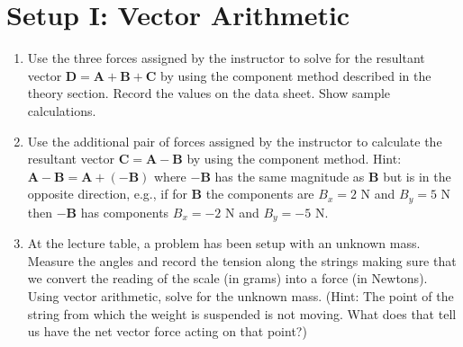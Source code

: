 \documentclass[main.tex]{subfiles}
\begin{document}
\section{Setup I: Vector Arithmetic}
\begin{enumerate}
\item
Use the three forces assigned by the instructor to solve for the resultant vector $\mathbf{D}=\mathbf{A}+\mathbf{B}+\mathbf{C}$ by using the component method described in the theory section. Record the values on the data sheet. Show sample calculations.
\item
Use the additional pair of forces assigned by the instructor to calculate the resultant vector $\mathbf{C}=\mathbf{A}-\mathbf{B}$ by using the component method. Hint: $\mathbf{A}-\mathbf{B}=\mathbf{A}+ (-\mathbf{B})$ where $-\mathbf{B}$ has the same magnitude as $\mathbf{B}$ but is in the opposite direction, e.g., if for $\mathbf{B}$ the components are $B_x=2\text{ N}$ and $B_y=5\text{ N}$ then $-\mathbf{B}$ has components $B_x=-2\text{ N}$ and $B_y=-5\text{ N}.$
\item \label{step:UnknownMass}
At the lecture table, a problem has been setup with an unknown mass. Measure the angles and record the tension along the strings making sure that we convert the reading of the scale (in grams) into a force (in Newtons). Using vector arithmetic, solve for the unknown mass. (Hint: The point of the string from which the weight is suspended is not moving. What does that tell us have the net vector force acting on that point?)
\end{enumerate}
\end{document}
